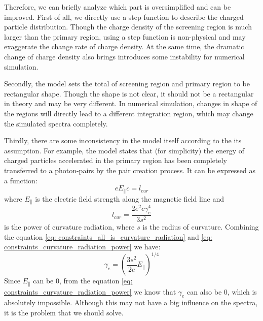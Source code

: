 \documentclass[12pt]{report}
\begin{document}
            Therefore, we can briefly analyze which part is oversimplified and can be improved. 
            First of all, we directly use a step function to describe the charged particle distribution. 
            Though the charge density of the screening region is much larger than the primary region, using 
            a step function is non-physical and may exaggerate the change rate of charge density. At the 
            same time, the dramatic change of charge density also brings introduces some instability for 
            numerical simulation. 

            Secondly, the model sets the total of screening region and primary region to be rectangular shape. 
            Though the shape is not clear, it should not be a rectangular in theory and may be very different.
            In numerical simulation, changes in shape of the regions will directly lead to a different 
            integration region, which may change the simulated spectra completely. 

            Thirdly, there are some inconsistency in the model itself according to the its assumption. 
            For example, the model states that (for simplicity) the energy of charged particles accelerated 
            in the primary region has been completely transferred to a photon-pairs by the pair creation process.
            It can be expressed as a function: 
            \begin{equation}
              \label{eq: constraints_all_is_curvature_radiation}
              e E_{\parallel} c = l_{cur}
            \end{equation}
            where $E_\parallel$ is the electric field strength along the magnetic field line and 
            \begin{equation}
              \label{eq: constraints_curvature_radiation_power}
              l_{cur} = \frac{2 e^2 c \gamma^{4}_{e}}{3s^2}
            \end{equation}
            is the power of curvature radiation, where $s$ is the radius of curvature. 
            Combining the equation \ref{eq: constraints_all_is_curvature_radiation} and 
            \ref{eq: constraints_curvature_radiation_power} we have: 
            \begin{equation}
              \label{eq: constraints_gamma_can_be_zero}
              \gamma_{e} = \left(\frac{3s^2}{2e} E_{\parallel}\right)^{1/4}
            \end{equation}
            Since $E_{\parallel}$ can be $0$, 
            from the equation \ref{eq: constraints_curvature_radiation_power} we know that 
            $\gamma_{e}$ can also be $0$, which is absolutely impossible. Although this may not have a big 
            influence on the spectra, it is the problem that we should solve. 
\end{document}
